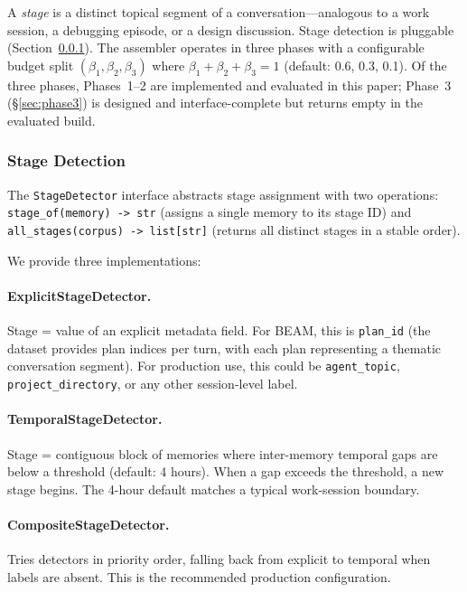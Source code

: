 \documentclass[11pt]{article}
\begin{document}
A \emph{stage} is a distinct topical segment of a conversation---analogous to a work session, a debugging episode, or a design
discussion.  Stage detection is pluggable (Section~\ref{sec:stage-detection}).
The assembler operates in three phases with a configurable budget
split $(\beta_1, \beta_2, \beta_3)$ where
$\beta_1 + \beta_2 + \beta_3 = 1$ (default: 0.6, 0.3, 0.1).
Of the three phases, Phases~1--2 are implemented and evaluated in this
paper; Phase~3 (\S\ref{sec:phase3}) is designed and interface-complete
but returns empty in the evaluated build.

\subsubsection{Stage Detection}
\label{sec:stage-detection}

The \texttt{StageDetector} interface abstracts stage assignment with
two operations: \texttt{stage\_of(memory) -> str} (assigns a single
memory to its stage ID) and \texttt{all\_stages(corpus) -> list[str]}
(returns all distinct stages in a stable order).

We provide three implementations:

\paragraph{ExplicitStageDetector.}
Stage = value of an explicit metadata field.  For BEAM, this is
\texttt{plan\_id} (the dataset provides plan indices per turn, with
each plan representing a thematic conversation segment).  For
production use, this could be \texttt{agent\_topic},
\texttt{project\_directory}, or any other session-level label.

\paragraph{TemporalStageDetector.}
Stage = contiguous block of memories where inter-memory temporal gaps
are below a threshold (default: 4 hours).  When a gap exceeds the
threshold, a new stage begins.  The 4-hour default matches a typical
work-session boundary.

\paragraph{CompositeStageDetector.}
Tries detectors in priority order, falling back from explicit to
temporal when labels are absent.  This is the recommended production
configuration.
\end{document}
